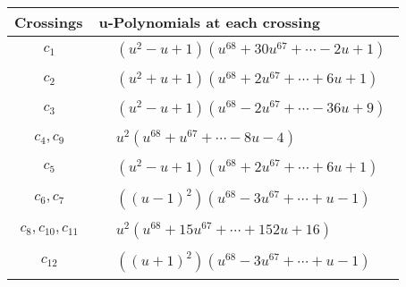 \documentclass[1p]{elsarticle_modified}
\theoremstyle{definition}
\begin{document}
\begin{tabular}{m{50pt}|m{274pt}}
Crossings & \hspace{64pt}u-Polynomials at each crossing \\
\hline $$\begin{aligned}c_{1}\end{aligned}$$&$\begin{aligned}
&(u^2- u+1)(u^{68}+30 u^{67}+\cdots-2 u+1)
\end{aligned}$\\
\hline $$\begin{aligned}c_{2}\end{aligned}$$&$\begin{aligned}
&(u^2+u+1)(u^{68}+2 u^{67}+\cdots+6 u+1)
\end{aligned}$\\
\hline $$\begin{aligned}c_{3}\end{aligned}$$&$\begin{aligned}
&(u^2- u+1)(u^{68}-2 u^{67}+\cdots-36 u+9)
\end{aligned}$\\
\hline $$\begin{aligned}c_{4},c_{9}\end{aligned}$$&$\begin{aligned}
&u^2(u^{68}+u^{67}+\cdots-8 u-4)
\end{aligned}$\\
\hline $$\begin{aligned}c_{5}\end{aligned}$$&$\begin{aligned}
&(u^2- u+1)(u^{68}+2 u^{67}+\cdots+6 u+1)
\end{aligned}$\\
\hline $$\begin{aligned}c_{6},c_{7}\end{aligned}$$&$\begin{aligned}
&((u-1)^2)(u^{68}-3 u^{67}+\cdots+u-1)
\end{aligned}$\\
\hline $$\begin{aligned}c_{8},c_{10},c_{11}\end{aligned}$$&$\begin{aligned}
&u^2(u^{68}+15 u^{67}+\cdots+152 u+16)
\end{aligned}$\\
\hline $$\begin{aligned}c_{12}\end{aligned}$$&$\begin{aligned}
&((u+1)^2)(u^{68}-3 u^{67}+\cdots+u-1)
\end{aligned}$\\
\hline
\end{tabular}\newpage\renewcommand{\arraystretch}{1}
\end{document}
